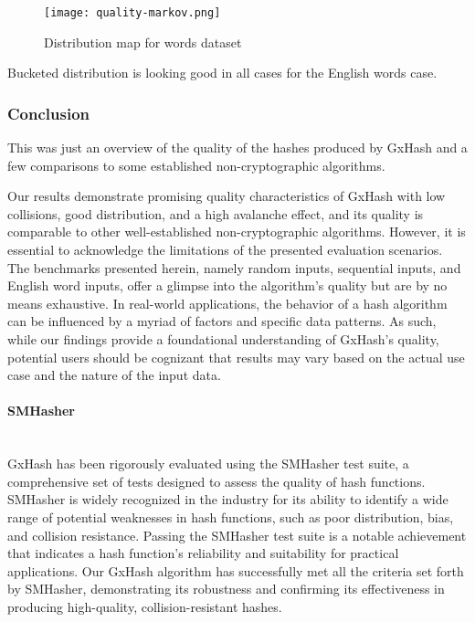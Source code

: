 \documentclass[10pt]{article}
\begin{document}
\begin{figure}[H]
\centering
\texttt{[image: quality-markov.png]}
\caption{Distribution map for words dataset}
\label{fig:quality-words}
\end{figure}

Bucketed distribution is looking good in all cases for the English words case.

\subsubsection{Conclusion}

This was just an overview of the quality of the hashes produced by GxHash and a few comparisons to some established non-cryptographic algorithms. 

Our results demonstrate promising quality characteristics of GxHash with low collisions, good distribution, and a high avalanche effect, and its quality is comparable to other well-established non-cryptographic algorithms. However, it is essential to acknowledge the limitations of the presented evaluation scenarios. The benchmarks presented herein, namely random inputs, sequential inputs, and English word inputs, offer a glimpse into the algorithm's quality but are by no means exhaustive. In real-world applications, the behavior of a hash algorithm can be influenced by a myriad of factors and specific data patterns. As such, while our findings provide a foundational understanding of GxHash's quality, potential users should be cognizant that results may vary based on the actual use case and the nature of the input data.

\paragraph{SMHasher}\leavevmode\\
GxHash has been rigorously evaluated using the SMHasher\cite{smhasher} test suite, a comprehensive set of tests designed to assess the quality of hash functions. SMHasher is widely recognized in the industry for its ability to identify a wide range of potential weaknesses in hash functions, such as poor distribution, bias, and collision resistance. Passing the SMHasher test suite is a notable achievement that indicates a hash function's reliability and suitability for practical applications. Our GxHash algorithm has successfully met all the criteria set forth by SMHasher, demonstrating its robustness and confirming its effectiveness in producing high-quality, collision-resistant hashes. 
\end{document}
